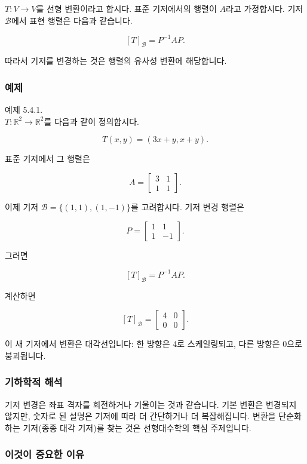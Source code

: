 \documentclass[
  12pt,
  a4paper,
]{article}
\begin{document}
\(T: V \to V\)를 선형 변환이라고 합시다. 표준 기저에서의 행렬이 \(A\)라고 가정합시다. 기저 \(\mathcal{B}\)에서 표현 행렬은 다음과 같습니다.

\[[T]_{\mathcal{B}} = P^{-1} A P.\]

따라서 기저를 변경하는 것은 행렬의 유사성 변환에 해당합니다.

\subsubsection{예제}\label{example-4}

예제 5.4.1.\\
\(T:\mathbb{R}^2 \to \mathbb{R}^2\)를 다음과 같이 정의합시다.

\[T(x,y) = (3x + y, x + y).\]

표준 기저에서 그 행렬은

\[A = \begin{bmatrix}
3 & 1 \\
1 & 1
\end{bmatrix}.\]

이제 기저 \(\mathcal{B} = \{ (1,1), (1,-1) \}\)를 고려합시다. 기저 변경 행렬은

\[P = \begin{bmatrix}
1 & 1 \\
1 & -1
\end{bmatrix}.\]

그러면

\[[T]_{\mathcal{B}} = P^{-1} A P.\]

계산하면

\[[T]_{\mathcal{B}} =
\begin{bmatrix}
4 & 0 \\
0 & 0
\end{bmatrix}.\]

이 새 기저에서 변환은 대각선입니다: 한 방향은 4로 스케일링되고, 다른 방향은 0으로 붕괴됩니다.

\subsubsection{기하학적 해석}\label{geometric-interpretation-11}

기저 변경은 좌표 격자를 회전하거나 기울이는 것과 같습니다. 기본 변환은 변경되지 않지만, 숫자로 된 설명은 기저에 따라 더 간단하거나 더 복잡해집니다. 변환을 단순화하는 기저(종종 대각 기저)를 찾는 것은 선형대수학의 핵심 주제입니다.

\subsubsection{이것이 중요한 이유}\label{why-this-matters-19}
\end{document}
